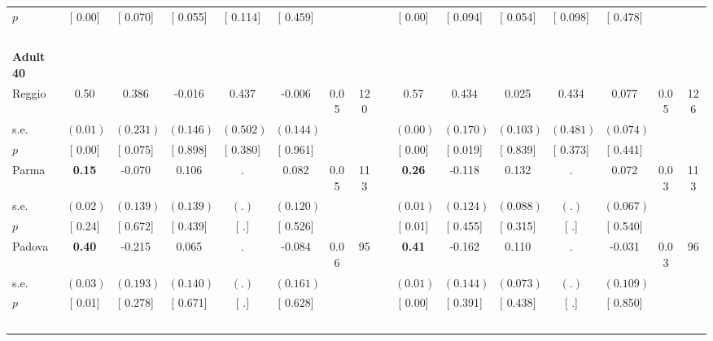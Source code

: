 \begin{longtable}{L{8em} c c c c c c c p{1em} c c c c c c c}
\quad \quad \quad \quad $ p$ & [     0.00] & [    0.070] & [    0.055] & [    0.114] & [    0.459] & & & & [     0.00] & [    0.094] & [    0.054] & [    0.098] & [    0.478] & &  \\[1em]
~\\[1em]
\quad \quad \textbf{Adult 40} & & & & & & & & & & & & & & & \\* 
\quad \quad \quad Reggio& 0.50 & $ \mathbf{    0.386}$ &    -0.016 &     0.437 &    -0.006 &      0.05 &       120 & & 0.57 & $ \mathbf{    0.434}$ &     0.025 &     0.434 &     0.077 &      0.05 &       126  \\*
\quad \quad \quad \quad s.e.& $ (     0.01)$ & $ (    0.231)$ & $ (    0.146)$ & $ (    0.502)$ & $ (    0.144)$ & & & & $ (     0.00)$ & $ (    0.170)$ & $ (    0.103)$ & $ (    0.481)$ & $ (    0.074)$ & &  \\*
\quad \quad \quad \quad $ p$ & [     0.00] & [    0.075] & [    0.898] & [    0.380] & [    0.961] & & & & [     0.00] & [    0.019] & [    0.839] & [    0.373] & [    0.441] & &  \\[1em]
\quad \quad \quad Parma& \textbf{     0.15} &    -0.070 &     0.106 &         . &     0.082 &      0.05 &       113 & & \textbf{     0.26} &    -0.118 &     0.132 &         . &     0.072 &      0.03 &       113  \\*
\quad \quad \quad \quad s.e.& $ (     0.02)$ & $ (    0.139)$ & $ (    0.139)$ & $ (        .)$ & $ (    0.120)$ & & & & $ (     0.01)$ & $ (    0.124)$ & $ (    0.088)$ & $ (        .)$ & $ (    0.067)$ & &  \\*
\quad \quad \quad \quad $ p$ & [     0.24] & [    0.672] & [    0.439] & [        .] & [    0.526] & & & & [     0.01] & [    0.455] & [    0.315] & [        .] & [    0.540] & &  \\[1em]
\quad \quad \quad Padova& \textbf{     0.40} &    -0.215 &     0.065 &         . &    -0.084 &      0.06 &        95 & & \textbf{     0.41} &    -0.162 &     0.110 &         . &    -0.031 &      0.03 &        96  \\*
\quad \quad \quad \quad s.e.& $ (     0.03)$ & $ (    0.193)$ & $ (    0.140)$ & $ (        .)$ & $ (    0.161)$ & & & & $ (     0.01)$ & $ (    0.144)$ & $ (    0.073)$ & $ (        .)$ & $ (    0.109)$ & &  \\*
\quad \quad \quad \quad $ p$ & [     0.01] & [    0.278] & [    0.671] & [        .] & [    0.628] & & & & [     0.00] & [    0.391] & [    0.438] & [        .] & [    0.850] & &  \\[1em]
~\\[1em]

\end{longtable}
